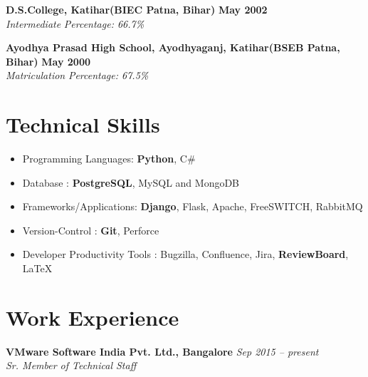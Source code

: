 \documentclass[margin,line]{resume}
\begin{document}
\begin{resume}
    \textbf{D.S.College, Katihar(BIEC Patna, Bihar)} \hfill \textbf{May 2002}\vspace{0mm}\\\vspace{0mm}%
    \textsl{Intermediate } \hfill \textsl{Percentage: 66.7\%}

    \textbf{Ayodhya Prasad High School, Ayodhyaganj, Katihar(BSEB Patna, Bihar)} \hfill \textbf{May 2000}\vspace{0mm}\\\vspace{0mm}%
    \textsl{Matriculation } \hfill \textsl{Percentage: 67.5\%}
    \section{\mysidestyle Technical Skills}
     \begin{itemize}
      \item Programming Languages: \textbf{Python}, C\#
      \item Database : \textbf{PostgreSQL}, MySQL and MongoDB
      \item Frameworks/Applications: \textbf{Django}, Flask, Apache, FreeSWITCH, RabbitMQ
      \item Version-Control : \textbf{Git}, Perforce
      \item Developer Productivity Tools : Bugzilla, Confluence, Jira, \textbf{ReviewBoard}, \LaTeX
     \end{itemize}

    \section{\mysidestyle Work Experience}

    \textbf{VMware Software India Pvt. Ltd., Bangalore} \hfill \textsl{Sep 2015 -- present} \vspace{0mm}\\\vspace{0mm}%
           \textsl{Sr. Member of Technical Staff}\\
    \begin{itemize}
    

\end{itemize}
\end{resume}
\end{document}
